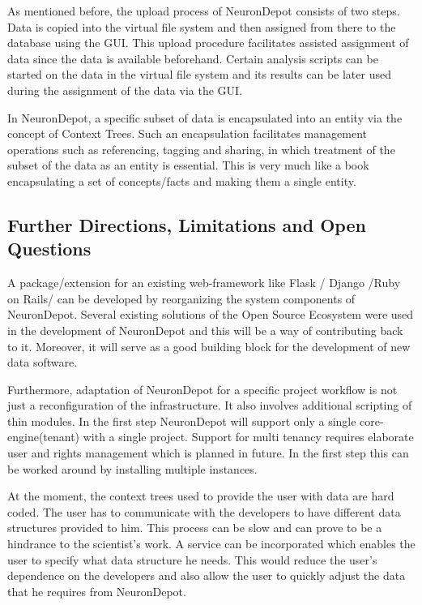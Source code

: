 \documentclass{frontiersSCNS} %
\begin{document}
As mentioned before, the upload process of NeuronDepot consists of two steps.
Data is copied into the virtual file system and then assigned from there to the
database using the GUI. This upload procedure facilitates assisted assignment
of data since the data is available beforehand. Certain analysis scripts can be
started on the data in the virtual file system and its results can be later
used during the assignment of the data via the GUI.

In NeuronDepot, a specific subset of data is encapsulated into an entity via
the concept of Context Trees. Such an encapsulation facilitates management
operations such as referencing, tagging and sharing, in which treatment of the
subset of the data as an entity is essential. This is very much like a book
encapsulating a set of concepts/facts and making them a single entity.

\subsection{Further Directions, Limitations and Open Questions}

A package/extension for an existing web-framework like Flask / Django /Ruby on
Rails/ can be developed by reorganizing the system components of NeuronDepot.
Several existing solutions of the Open Source Ecosystem were used in the
development of NeuronDepot and this will be a way of contributing back to it.
Moreover, it will serve as a good building block for the development of new
data software.

Furthermore, adaptation of NeuronDepot for a specific project workflow is not
just a reconfiguration of the infrastructure. It also involves additional
scripting of thin modules. In the first step NeuronDepot will support only a
single core-engine(tenant) with a single project. Support for multi tenancy
requires elaborate user and rights management which is planned in future. In
the first step this can be worked around by installing multiple instances.

At the moment, the context trees used to provide the user with data are hard
coded. The user has to communicate with the developers to have different data
structures provided to him. This process can be slow and can prove to be a
hindrance to the scientist's work. A service can be incorporated which enables
the user to specify what data structure he needs. This would reduce the user's
dependence on the developers and also allow the user to quickly adjust the data
that he requires from NeuronDepot.
\end{document}
